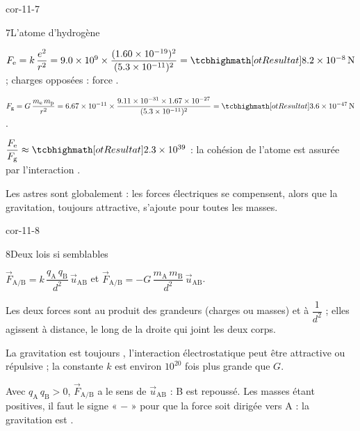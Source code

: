 \begin{blocLivre}{cor-11-7}
\begin{corrige}{7}{L'atome d'hydrogène}
\begin{questions}
\item $F_\mathrm{e}=k\,\dfrac{e^2}{r^2}=\num{9,0e9}\times\dfrac{(\num{1,60e-19})^2}{(\num{5,3e-11})^2}=\res{\qty{8,2e-8}{N}}$ ; charges opposées : force .
\item $F_\mathrm{g}=G\,\dfrac{m_\mathrm{e}\,m_\mathrm{p}}{r^2}=\num{6,67e-11}\times\dfrac{\num{9,11e-31}\times\num{1,67e-27}}{(\num{5,3e-11})^2}=\res{\qty{3,6e-47}{N}}$.
\item $\dfrac{F_\mathrm{e}}{F_\mathrm{g}}\approx\res{\num{2,3e39}}$ : la cohésion de l'atome est assurée par l'interaction .
\item Les astres sont globalement  : les forces électriques se compensent, alors que la gravitation, toujours
attractive, s'ajoute pour toutes les masses.
\end{questions}
\end{corrige}
\end{blocLivre}
\begin{blocLivre}{cor-11-8}
\begin{corrige}{8}{Deux lois si semblables}
\begin{questions}
\item $\vec{F}_{\mathrm{A}/\mathrm{B}}=k\,\dfrac{q_\mathrm{A}\,q_\mathrm{B}}{d^2}\,\vec{u}_{\mathrm{AB}}$ et $\vec{F}_{\mathrm{A}/\mathrm{B}}=-G\,\dfrac{m_\mathrm{A}\,m_\mathrm{B}}{d^2}\,\vec{u}_{\mathrm{AB}}$.
\item Les deux forces sont  au produit des grandeurs (charges ou masses) et à $\dfrac{1}{d^2}$ ; elles agissent à
distance, le long de la droite qui joint les deux corps.
\item La gravitation est toujours , l'interaction électrostatique peut être attractive ou répulsive ; la constante
$k$ est environ $10^{20}$ fois plus grande que $G$.
\item Avec $q_\mathrm{A}\,q_\mathrm{B}>0$, $\vec{F}_{\mathrm{A}/\mathrm{B}}$ a le sens de $\vec{u}_{\mathrm{AB}}$ : B est repoussé. Les masses étant positives, il faut le signe
« $-$ » pour que la force soit dirigée vers A : la gravitation est .
\end{questions}
\end{corrige}
\end{blocLivre}
